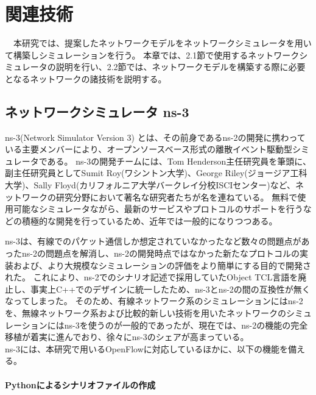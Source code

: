 \chapter{関連技術}

　本研究では、提案したネットワークモデルをネットワークシミュレータを用いて構築しシミュレーションを行う。
本章では、2.1節で使用するネットワークシミュレータの説明を行い、2.2節では、ネットワークモデルを構築する際に必要となるネットワークの諸技術を説明する。

\section{ネットワークシミュレータ ns-3}

ns-3(Network Simulator Version 3)\cite{ns3} \cite{ns3text} とは、その前身であるns-2の開発に携わっている主要メンバーにより、オープンソースベース形式の離散イベント駆動型シミュレータである。
ns-3の開発チームには、Tom Henderson主任研究員を筆頭に、副主任研究員としてSumit Roy(ワシントン大学)、George Riley(ジョージア工科大学)、Sally Floyd(カリフォルニア大学バークレイ分校ISCIセンター)など、ネットワークの研究分野において著名な研究者たちが名を連ねている。
無料で使用可能なシミュレータながら、最新のサービスやプロトコルのサポートを行うなどの積極的な開発を行っているため、近年では一般的になりつつある。

ns-3は、有線でのパケット通信しか想定されていなかったなど数々の問題点があったns-2の問題点を解消し、ns-2の開発時点ではなかった新たなプロトコルの実装および、より大規模なシミュレーションの評価をより簡単にする目的で開発された。
これにより、ns-2でのシナリオ記述で採用していたObject TCL言語を廃止し、事実上C++でのデザインに統一したため、ns-3とns-2の間の互換性が無くなってしまった。
そのため、有線ネットワーク系のシミュレーションにはns-2を、無線ネットワーク系および比較的新しい技術を用いたネットワークのシミュレーションにはns-3を使うのが一般的であったが、現在では、ns-2の機能の完全移植が着実に進んでおり、徐々にns-3のシェアが高まっている。 \\

ns-3には、本研究で用いるOpenFlowに対応しているほかに、以下の機能を備える。

\subsubsection{Pythonによるシナリオファイルの作成}

